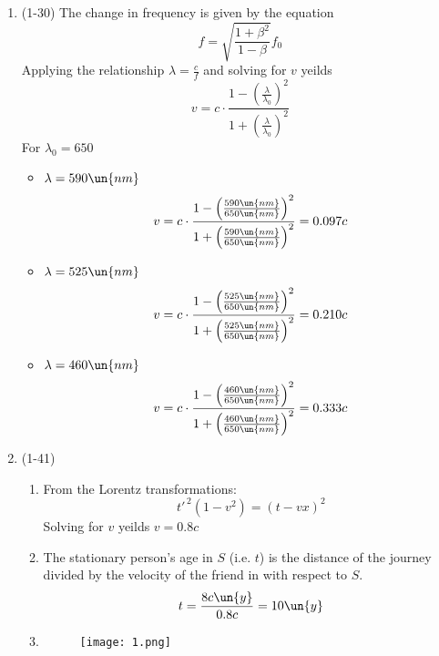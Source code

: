 \documentclass{physicsHW}
\begin{document}
\maketitle
	
	\begin{enumerate}
		
		\item (1-30) The change in frequency is given by the equation
		\[
			f = \sqrt{\frac{1 + \beta^2}{1 - \beta}}f_0 
		\]
		 Applying the relationship $\lambda = \frac{c}{f}$ and solving for $v$ yeilds
		\[
			v =c \cdot \frac{1 - \left( \frac{\lambda}{\lambda_0} \right)^2 }{1 +\left( \frac{\lambda}{\lambda_0} \right)^2} 
		\]
		For $\lambda_0 = 650$
		
		\begin{itemize}
			\item $\lambda = 590 \un{nm}$
			\[
				v =c \cdot \frac{1 - \left( \frac{590\un{nm}}{650\un{nm}} \right)^2 }{1 +\left( \frac{590\un{nm}}{650\un{nm}} \right)^2} = 0.097c
			\]
			\item $\lambda = 525 \un{nm}$
			\[
				v =c \cdot \frac{1 - \left( \frac{525\un{nm}}{650\un{nm}} \right)^2 }{1 +\left( \frac{525\un{nm}}{650\un{nm}} \right)^2} = 0.210c
			\]
			\item $\lambda = 460 \un{nm}$
			\[
				v =c \cdot \frac{1 - \left( \frac{460\un{nm}}{650\un{nm}} \right)^2 }{1 +\left( \frac{460\un{nm}}{650\un{nm}} \right)^2} = 0.333c
			\]
		\end{itemize}
		
		
		
		\item (1-41)
		\begin{enumerate}
			\item From the Lorentz transformations: 
			\[
				t'^{\, 2} (1-v^2) = (t - vx)^2	
			\]
			Solving for $v$ yeilds $v = 0.8c$
			\item
			The stationary person's age in $S$ (i.e. $t$) is the distance of the journey divided by the velocity of the friend in with respect to $S$.
			\[
				t = \frac{8c \un{y}}{0.8c} = 10 \un{y} 
			\]
			\item 
			\leavevmode\vadjust{\vspace{-\baselineskip}}\newline
			\begin{figure}[ht!]
			\begin{center}
			    \texttt{[image: 1.png]}
			\end{center}
			\end{figure}



\end{enumerate}
\end{enumerate}
\end{document}
